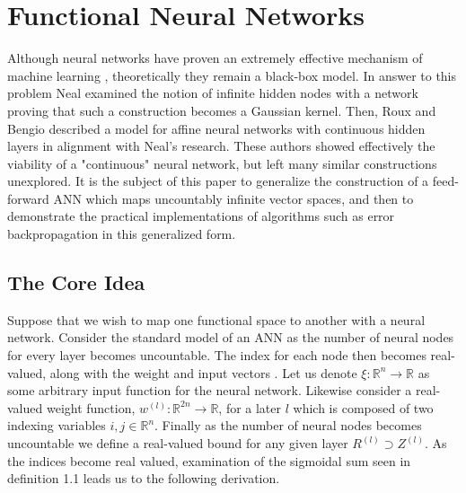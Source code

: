 \section{Functional Neural Networks}

Although neural networks have proven an extremely effective mechanism of machine learning \cite{mlsurvey}, theoretically they remain a black-box model.  In answer to this problem Neal examined the notion of infinite hidden nodes with a network proving that such a construction becomes a Gaussian kernel. Then, Roux and Bengio described a model for affine neural networks with continuous hidden layers in alignment with Neal's research. These authors showed effectively the viability of a "continuous" neural network, but left many similar constructions unexplored. It is the subject of this paper to generalize the construction of a feed-forward ANN which maps uncountably infinite vector spaces, and then to demonstrate the practical implementations of algorithms such as error backpropagation in this generalized form.

\subsection{The Core Idea}
Suppose that we wish to map one functional space to another with a neural network. Consider the standard model of an ANN as the number of neural nodes for every layer becomes uncountable. The index for each node then becomes real-valued, along with the weight and input vectors 
. Let us denote \(\xi: \mathbb{R}^n\to\mathbb{R}\) as some arbitrary input function for the neural network. Likewise consider a real-valued weight function, \(w^{(l)}: \mathbb{R}^{2n}\to\mathbb{R}\), for a later $l$ which is composed of two indexing variables $i,j \in \mathbb{R}^n$. Finally as the number of neural nodes becomes uncountable we define a real-valued bound for any given layer $R^{(l)} \supset Z^{(l)}$.  As the indices become real valued, examination of the sigmoidal sum seen in definition 1.1 leads us to the following derivation.


